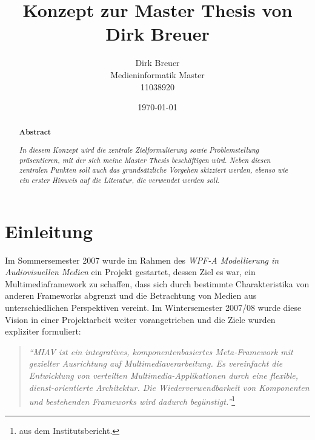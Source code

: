 \documentclass[11pt,headsepline,a4paper,bibtotoc,liststotoc,DIV12,BCOR12mm]{scrartcl}
\title{Konzept zur Master Thesis von Dirk Breuer}
\author{Dirk Breuer\\Medieninformatik Master\\11038920}
\date{\today}
\begin{document}
  
\dosecttoc

\ifpdf
{}
\else
{}
\fi

\maketitle

\begin{abstract}
  \begin{center}
    \textbf{Abstract\\}
    \vspace{.3cm}
  \end{center}
  \emph{In diesem Konzept wird die zentrale Zielformulierung sowie Problemstellung präsentieren, mit der sich meine Master Thesis beschäftigen wird. Neben diesen zentralen Punkten soll auch das grundsätzliche Vorgehen skizziert werden, ebenso wie ein erster Hinweis auf die Literatur, die verwendet werden soll.}
\end{abstract}
  


\newpage
\tableofcontents

\section{Einleitung} %
\label{sec:einleitung}

  Im Sommersemester 2007 wurde im Rahmen des \emph{WPF-A Modellierung in Audiovisuellen Medien} ein Projekt gestartet, dessen Ziel es war, ein Multimediaframework zu schaffen, dass sich durch bestimmte Charakteristika von anderen Frameworks abgrenzt und die Betrachtung von Medien aus unterschiedlichen Perspektiven vereint. Im Wintersemester 2007/08 wurde diese Vision in einer Projektarbeit weiter vorangetrieben und die Ziele wurden expliziter formuliert:
  
  \begin{quote}
    \emph{"`MIAV ist ein integratives, komponentenbasiertes Meta-Framework mit gezielter Ausrichtung auf Multimediaverarbeitung. Es vereinfacht die Entwicklung von verteilten Multimedia-Applikationen durch eine flexible, dienst-orientierte Architektur. Die Wiederverwendbarkeit von Komponenten und bestehenden Frameworks wird dadurch begünstigt."'}\footnote{aus dem Institutsbericht.}
  \end{quote}
  
\end{document}
